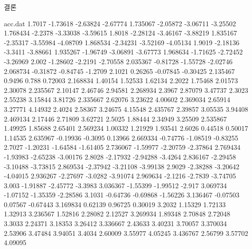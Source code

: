 \documentclass[Junlampaper, portrait]{Junlam_PosterK}
\begin{document}
\begin{poster}
\begin{posterbox}[name=result,column=3,]{결론  }
\begin{filecontents}{acc.dat}
                1.7017	-1.73618	-2.63824	-2.67774
                1.735067	-2.05872	-3.06711	-3.25502
                1.768434	-2.2378	-3.33038	-3.59615
                1.8018	-2.28124	-3.46167	-3.88219
                1.835167	-2.35317	-3.55984	-4.08709
                1.868534	-2.34231	-3.52169	-4.05134
                1.9019	-2.18136	-3.3411	-3.88661
                1.935267	-1.96749	-3.06891	-3.67773
                1.968634	-1.71625	-2.72452	-3.26969
                2.002	-1.28602	-2.2191	-2.70558
                2.035367	-0.81728	-1.55728	-2.02746
                2.068734	-0.31872	-0.84745	-1.2709
                2.1021	0.26265	-0.07845	-0.30425
                2.135467	0.9496	0.788	0.72003
                2.168834	1.40154	1.52533	1.62134
                2.2022	1.75468	2.01573	2.30078
                2.235567	2.10147	2.46746	2.94581
                2.268934	2.3967	2.87079	3.47737
                2.3023	2.55238	3.15844	3.81726
                2.335667	2.62076	3.23622	4.00602
                2.369034	2.65914	3.27771	4.14932
                2.4024	2.58367	3.24675	4.15548
                2.435767	2.39857	3.05535	3.94408
                2.469134	2.17446	2.71809	3.62721
                2.5025	1.88444	2.34949	3.25509
                2.535867	1.49925	1.85688	2.65401
                2.569234	1.00332	1.21929	1.93541
                2.6026	0.44518	0.50017	1.14535
                2.635967	-0.19936	-0.3095	0.13966
                2.669334	-0.74776	-1.08519	-0.83255
                2.7027	-1.20231	-1.64584	-1.61405
                2.736067	-1.59977	-2.20759	-2.37864
                2.769434	-1.93983	-2.65238	-3.00176
                2.8028	-2.17932	-2.94288	-3.4264
                2.836167	-2.29458	-3.10488	-3.73815
                2.869534	-2.37942	-3.21108	-3.99138
                2.9029	-2.38288	-3.20642	-4.04015
                2.936267	-2.27697	-3.0282	-3.91074
                2.969634	-2.1216	-2.7839	-3.74705
                3.003	-1.91887	-2.45772	-3.3983
                3.036367	-1.55399	-1.99512	-2.917
                3.069734	-1.07152	-1.35359	-2.28586
                3.1031	-0.64736	-0.69868	-1.56226
                3.136467	-0.07503	0.07567	-0.67443
                3.169834	0.62139	0.96725	0.30019
                3.2032	1.15329	1.72133	1.32913
                3.236567	1.52816	2.28082	2.12527
                3.269934	1.89348	2.70848	2.72048
                3.3033	2.24371	3.18353	3.26412
                3.336667	2.43633	3.40231	3.70057
                3.370034	2.53906	3.47484	3.94051
                3.4034	2.60009	3.55977	4.05245
                3.436767	2.56799	3.57702	4.09095

\end{filecontents}
\end{posterbox}
\end{poster}
\end{document}
